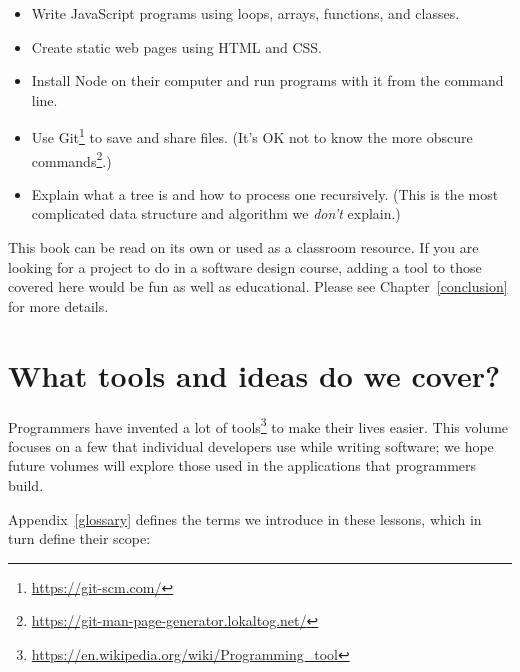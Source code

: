 \documentclass[krantzl]{krantz}
\newcommand{\appref}[1]{Appendix~\ref{#1}}
\newcommand{\chapref}[1]{Chapter~\ref{#1}}
\newcommand{\hreffoot}[2]{{#1}\footnote{\href{#2}{#2}}}
\begin{document}
\begin{itemize}

\item 

Write JavaScript programs using loops, arrays, functions, and classes.



\item 

Create static web pages using HTML and CSS.



\item 

Install Node on their computer
    and run programs with it from the command line.



\item 

Use \hreffoot{Git}{https://git-scm.com/} to save and share files.
    (It's OK not to know \hreffoot{the more obscure commands}{https://git-man-page-generator.lokaltog.net/}.)



\item 

Explain what a tree is and how to process one recursively.
    (This is the most complicated data structure and algorithm we \emph{don't} explain.)



\end{itemize}


This book can be read on its own or used as a classroom resource.
If you are looking for a project to do in a software design course,
adding a tool to those covered here would be fun as well as educational.
Please see \chapref{conclusion} for more details.

\section{What tools and ideas do we cover?}\label{introduction-contents}


Programmers have invented \hreffoot{a lot of tools}{https://en.wikipedia.org/wiki/Programming\_tool} to make their lives easier.
This volume focuses on a few that individual developers use while writing software;
we hope future volumes
will explore those used in the applications that programmers build.


\appref{glossary} defines the terms we introduce in these lessons,
which in turn define their scope:
\end{document}
